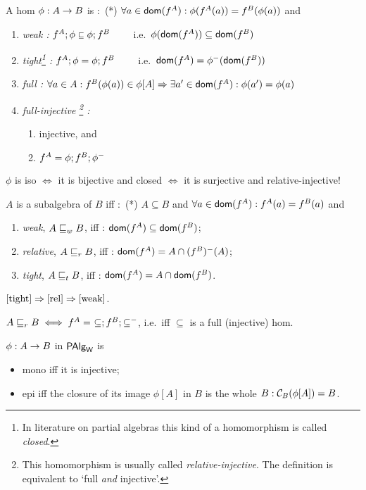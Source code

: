 \documentclass[10pt]{article}
\begin{document}
\begin{Definition}\label{de:PAs}
A hom $\phi:A\rightarrow B$ is :\ (*) $\forall a\in \mbox{\sf dom}(f^A):
\phi(f^A(a))= f^B(\phi(a))$ and

\begin{enumerate} \MyLPar
\item 
{\em weak :} $f^A;\phi\mathrel{{\scriptstyle{\sqsubseteq}}}\phi;f^B$ \ \ \ \
i.e.\ $\phi(\mbox{\sf dom}(f^A)) \subseteq \mbox{\sf dom}(f^B)$
\item 
{\em tight\footnote{In literature on partial algebras this kind of a
homomorphism is called {\em closed}.} :}  
$f^A;\phi=\phi;f^B$ \ \ \ \ 
i.e.\  $\mbox{\sf dom}(f^A)= \phi^{-}(\mbox{\sf dom}(f^B))$
\item 
{\em full :} $\forall a\in A: f^B(\phi(a))\in \phi[A]
\Rightarrow \exists a'\in \mbox{\sf dom}(f^A):\phi(a')=\phi(a)$
\item 
{\em full-injective \footnote{This
homomorphism is usually called {\em  relative-injective}. The
definition is equivalent to `full {\em and} injective'.} :}
\begin{enumerate}\MyLPar
 \item injective, and
 \item $f^A= \phi;f^B;\phi^{-}$
 \end{enumerate} 
\end{enumerate} 
\end{Definition}
%
\begin{Fact}
$\phi$ is iso $\iff$ it is bijective and closed
$\iff$ it is surjective and relative-injective!
\end{Fact}
%
\begin{Definition}
$A$ is a subalgebra of $B$ iff :\ 
  (*) $A\subseteq B$ and $\forall a\in \mbox{\sf dom}(f^A): f^A(a)= f^B(a)$ and
\begin{enumerate}\MyLPar
\item\label{weak} {\em weak}, $A\mathrel{\sqsubseteq}_w B$, iff : 
   $\mbox{\sf dom}(f^A) \subseteq \mbox{\sf dom}(f^B)$;
\item\label{rel} {\em relative}, $A\mathrel{\sqsubseteq}_r B$, iff : 
   $\mbox{\sf dom}(f^A) = A \cap (f^B)^{-}(A)$;
\item\label{tight} {\em tight}, $A\mathrel{\sqsubseteq}_t B$, iff : 
   $\mbox{\sf dom}(f^A) = A \cap \mbox{\sf dom}(f^B)$.
\end{enumerate}
\end{Definition}
%
\begin{Fact}
$\ref{tight} \Rightarrow \ref{rel} \Rightarrow \ref{weak}$.
\end{Fact}
%
\begin{Fact}
$A\suba_r B \iff f^A =\ \Comp{\Comp{\subseteq}{f^B}}{\subseteq^-}$, i.e.\ iff
$\subseteq$ is a full (injective) hom.
\end{Fact}
%
\begin{Fact}
$\phi:A\rightarrow B$ in $\mbox{\rm\sf PAlg}_{\sf W}$ is 
\begin{itemize}\MyLPar
\item mono iff it is injective;
\item epi iff the closure of its image $\phi[A]$ in $B$ is the whole
$B: {\cal C}_B(\phi[A])=B$.
\end{itemize}
\end{Fact}
\end{document}
